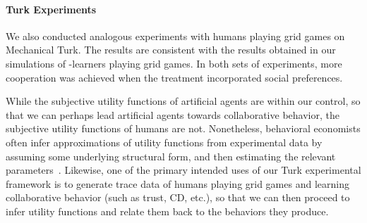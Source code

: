
\vspace{\up}
\paragraph{Turk Experiments}
\label{sec:human}

We also conducted analogous experiments with humans playing grid games
on Mechanical Turk.
%
%
The results are consistent
with the results obtained in our simulations of \Q-learners playing
grid games.  In both sets of experiments, more cooperation was
achieved when the treatment incorporated social preferences.

While the subjective utility functions of artificial agents are within
our control, so that we can perhaps lead artificial agents towards
collaborative behavior, the subjective utility functions of humans are
not.  Nonetheless, behavioral economists often infer approximations of
utility functions from experimental data by assuming some underlying
structural form, and then estimating the relevant
parameters~\cite{blanco11,fisman07}.
Likewise, one of the primary intended uses of our Turk experimental
framework is to generate trace data of humans playing grid games and
learning collaborative behavior (such as trust, CD, etc.), so that we
can then proceed to infer utility functions and relate them back to
the behaviors they produce.

